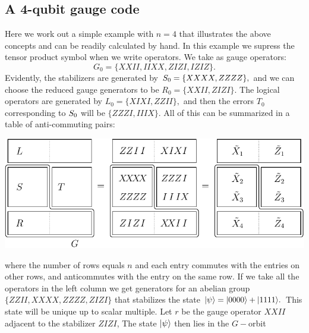 \documentclass[12pt]{article}
\begin{document}
\subsection{A 4-qubit gauge code}

Here we work out a simple example with $n=4$
that illustrates the above concepts and can
be readily calculated by hand.
In this example we supress the tensor product
symbol when we write operators.
We take as gauge operators:
$$
    G_0 = \{XXII, IIXX, ZIZI, IZIZ\}.
$$
Evidently, the stabilizers are generated by $S_0=\{XXXX, ZZZZ\},$
and we can choose the reduced gauge generators to be $R_0=\{XXII, ZIZI\}.$
The logical operators are generated by $L_0 = \{XIXI, ZZII\},$
and then the errors $T_0$ corresponding to $S_0$ will
be $\{ZZZI, IIIX\}.$
All of this can be summarized in a table of anti-commuting pairs:
\begin{center}
\includegraphics[]{pic-gauge4.pdf}
\end{center}
where the number of rows equals $n$ and each entry
commutes with the entries on other rows, and anticommutes
with the entry on the same row. 
If we take all the operators in the left column
we get generators for an abelian group 
$\{ ZZII, XXXX, ZZZZ, ZIZI \}$ 
that stabilizes the
state $|{\psi}\rangle = |{0000}\rangle+|{1111}\rangle.$
This state will be unique up to scalar multiple.
Let $r$ be the gauge operator $XXII$ adjacent to the 
stabilizer $ZIZI$,
The state $|{\psi}\rangle$ then lies in the $G-$orbit 
\end{document}
